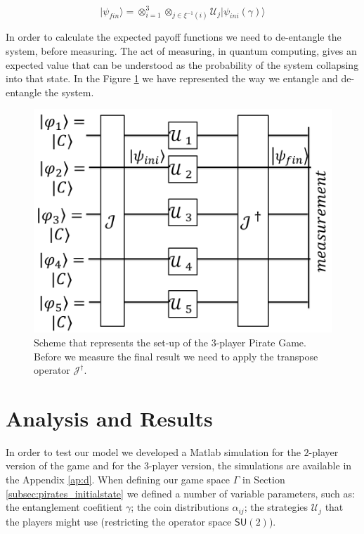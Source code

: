 \documentclass[10pt,twocolumn]{llncs}
\begin{document}
\begin{equation}
\vert\psi_{fin}\rangle=\otimes_{i=1}^{3}\otimes_{j\in\xi^{-1}(i)}\mathcal{U}_{j}\vert\psi_{ini}(\gamma)\rangle
\label{eq:piratas_final_move}
\end{equation}


In order to calculate the expected payoff functions we need to de-entangle the system, before measuring. The act of measuring, in quantum computing, gives an expected value that can be understood as the probability of the system collapsing into that state. In the Figure \ref{fig:pg_architecture3players} we have represented the way we entangle and de-entangle the system.

\begin{figure}[h]
\centering 
\includegraphics[scale=0.14]{Figures/architecture/esquema/esquema.png}
\caption{Scheme that represents the set-up of the $3$-player Pirate Game. Before we measure the final result we need to apply the transpose operator $\mathcal{J}^{\dagger}$. }
\label{fig:pg_architecture3players}
\end{figure}








\section{Analysis and Results}
\label{sec:description_3}


In order to test our model we developed a Matlab simulation for the $2$-player version of the game and for the $3$-player version, the simulations are available in the Appendix \ref{ap:d}. When defining our game space $\Gamma$ in Section \ref{subsec:pirates_initialstate} we defined a number of variable parameters, such as: the entanglement coefitient $\gamma$; the coin distributions $\alpha_{ij}$; the strategies $\mathcal{U}_{j}$ that the players might use (restricting the operator space $\mathsf{SU}(2)$).
\end{document}
